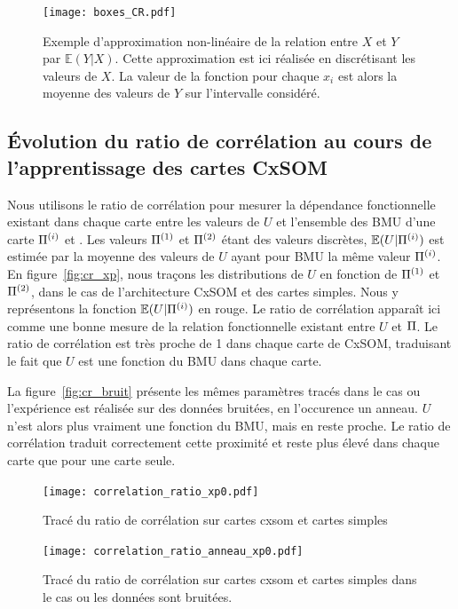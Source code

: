 \documentclass[../main]{subfiles}
\begin{document}
\begin{figure}
    \centering
    \texttt{[image: boxes\_CR.pdf]}
    \caption{Exemple d'approximation non-linéaire de la relation entre $X$ et $Y$ par $\mathbb{E}(Y|X)$. Cette approximation est ici réalisée en discrétisant les valeurs de $X$. La valeur de la fonction pour chaque $x_i$ est alors la moyenne des valeurs de $Y$ sur l'intervalle considéré.}
\end{figure}

\subsection{\'Evolution du ratio de corrélation au cours de l'apprentissage des cartes CxSOM}

Nous utilisons le ratio de corrélation pour mesurer la dépendance fonctionnelle existant dans chaque carte entre les valeurs de $U$ et l'ensemble des BMU d'une carte $\Pi^{({i})}$ et .
Les valeurs $\Pi^{({1})}$ et $\Pi^{({2})}$ étant des valeurs discrètes, $\mathbb{E}(U|\Pi^{({i})})$ est estimée par la moyenne des valeurs de $U$ ayant pour BMU la même valeur $\Pi^{({i})}$. 
En figure~\ref{fig:cr_xp}, nous traçons les distributions de $U$ en fonction de $\Pi^{({1})}$ et $\Pi^{({2})}$, dans le cas de l'architecture CxSOM et des cartes simples. Nous y représentons la fonction $\mathbb{E}(U|\Pi^{({i})})$ en rouge.
Le ratio de corrélation apparaît ici comme une bonne mesure de la relation fonctionnelle existant entre $U$ et $\Pi$. Le ratio de corrélation est très proche de 1 dans chaque carte de CxSOM, traduisant le fait que $U$ est une fonction du BMU dans chaque carte.

La figure~\ref{fig:cr_bruit} présente les mêmes paramètres tracés dans le cas ou l'expérience est réalisée sur des données bruitées, en l'occurence un anneau. $U$ n'est alors plus vraiment une fonction du BMU, mais en reste proche. Le ratio de corrélation traduit correctement cette proximité et reste plus élevé dans chaque carte que pour une carte seule. 

\begin{figure}
    \texttt{[image: correlation\_ratio\_xp0.pdf]}
    \caption{Tracé du ratio de corrélation sur cartes cxsom et cartes simples}
\end{figure}

\begin{figure}
    \texttt{[image: correlation\_ratio\_anneau\_xp0.pdf]}
    \caption{Tracé du ratio de corrélation sur cartes cxsom et cartes simples dans le cas ou les données sont bruitées.}
\end{figure}
\end{document}
